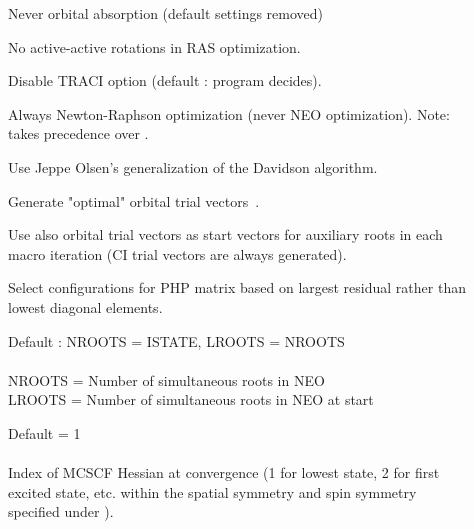 \begin{description}
\item[]
  Never orbital absorption (default settings removed)

\item[]
  No active-active rotations in RAS optimization.

\item[]
  Disable TRACI option (default : program decides).

\item[]
  Always Newton-Raphson optimization (never NEO optimization).
  Note:  takes precedence over
  .

\item[]
  Use Jeppe Olsen's generalization of the Davidson
  algorithm.

\item[]
  Generate "optimal" orbital trial
  vectors~\cite{hjajpjhajcp87}. 

\item[]
  Use also orbital trial vectors as start vectors for auxiliary roots
  in each macro iteration (CI trial vectors are always generated).

\item[]
  Select configurations for PHP matrix based on largest residual
  rather than lowest diagonal elements.

\item[]
  Default : NROOTS = ISTATE, LROOTS = NROOTS\\
   \\
  NROOTS = Number of simultaneous roots in NEO\\
  LROOTS = Number of simultaneous roots in NEO at start

\item[]
  Default = 1\\
   \\
  Index of MCSCF Hessian at convergence (1 for
  lowest state, 2 for first
  excited state, etc. within the spatial symmetry and
  spin symmetry
  specified under ).


\end{description}
